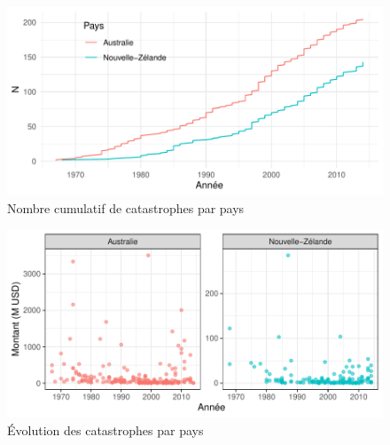 \begin{figure}[h]
\begin{center}
\includegraphics{images/fig-006}
\end{center}
\caption{Nombre cumulatif de catastrophes par pays}
\label{fig:3.2}
\end{figure}


\begin{figure}[h]
\begin{center}
\includegraphics{images/fig-007}
\end{center}
\caption{Évolution des catastrophes par pays}
\label{fig:3.3}
\end{figure}   

